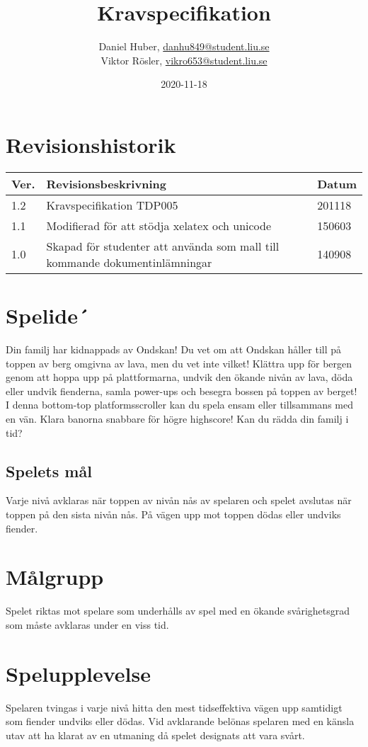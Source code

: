 \documentclass{TDP005mall}
\author{Daniel Huber, \url{danhu849@student.liu.se}\\
  Viktor Rösler, \url{vikro653@student.liu.se}}
\title{Kravspecifikation}
\date{2020-11-18}
\begin{document}
\projectpage
\tableofcontents
\section{Revisionshistorik}
\begin{table}[!h]
\begin{tabularx}{\linewidth}{|l|X|l|}
\hline
Ver. & Revisionsbeskrivning & Datum \\\hline
1.2 & Kravspecifikation TDP005 & 201118 \\\hline
1.1 & Modifierad för att stödja xelatex och unicode & 150603 \\\hline
1.0 & Skapad för studenter att använda som mall till
kommande dokumentinlämningar & 140908 \\\hline
\end{tabularx}
\end{table}


\section{Spelide´}%
Din familj har kidnappads av Ondskan! Du vet om att Ondskan håller till på toppen av berg omgivna av lava, men du vet inte vilket! Klättra upp för bergen genom att hoppa upp på plattformarna, undvik den ökande nivån av lava, döda eller undvik fienderna, samla power-ups och besegra bossen på toppen av berget! I denna bottom-top platformsscroller kan du spela ensam eller tillsammans med en vän. Klara banorna snabbare för högre highscore! Kan du rädda din familj i tid?

\subsection{Spelets mål}
Varje nivå avklaras när toppen av nivån nås av spelaren och spelet avslutas när toppen på den sista nivån nås. På vägen upp mot toppen dödas eller undviks fiender. 

\section{Målgrupp}%
Spelet riktas mot spelare som underhålls av spel med en ökande svårighetsgrad som måste avklaras under en viss tid. 

\section{Spelupplevelse}%
Spelaren tvingas i varje nivå hitta den mest tidseffektiva vägen upp samtidigt som fiender undviks eller dödas. Vid avklarande belönas spelaren med en känsla utav att ha klarat av en utmaning då spelet designats att vara svårt.  
\end{document}
